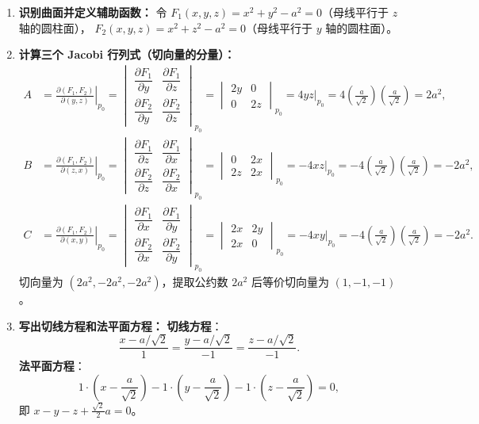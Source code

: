 \documentclass[lang=cn,11pt]{elegantbook}
\begin{document}
\begin{solution}
\begin{enumerate}
  \item \textbf{识别曲面并定义辅助函数：}
  令 $F_1(x,y,z)=x^2+y^2-a^2=0$（母线平行于 $z$ 轴的圆柱面），
  $F_2(x,y,z)=x^2+z^2-a^2=0$（母线平行于 $y$ 轴的圆柱面）。

  \item \textbf{计算三个 Jacobi 行列式（切向量的分量）：}
  \begin{align*}
  A &= \left.\frac{\partial(F_1,F_2)}{\partial(y,z)}\right|_{p_0}
   = \begin{vmatrix}
      \dfrac{\partial F_1}{\partial y}&\dfrac{\partial F_1}{\partial z}\\[8pt]
      \dfrac{\partial F_2}{\partial y}&\dfrac{\partial F_2}{\partial z}
    \end{vmatrix}_{p_0}
   = \begin{vmatrix} 2y & 0 \\ 0 & 2z \end{vmatrix}_{p_0}
   = 4yz\Big|_{p_0} = 4\left(\frac{a}{\sqrt{2}}\right)\left(\frac{a}{\sqrt{2}}\right) = 2a^2,\\[10pt]
  B &= \left.\frac{\partial(F_1,F_2)}{\partial(z,x)}\right|_{p_0}
   = \begin{vmatrix}
      \dfrac{\partial F_1}{\partial z}&\dfrac{\partial F_1}{\partial x}\\[8pt]
      \dfrac{\partial F_2}{\partial z}&\dfrac{\partial F_2}{\partial x}
    \end{vmatrix}_{p_0}
   = \begin{vmatrix} 0 & 2x \\ 2z & 2x \end{vmatrix}_{p_0}
   = -4xz\Big|_{p_0} = -4\left(\frac{a}{\sqrt{2}}\right)\left(\frac{a}{\sqrt{2}}\right) = -2a^2,\\[10pt]
  C &= \left.\frac{\partial(F_1,F_2)}{\partial(x,y)}\right|_{p_0}
   = \begin{vmatrix}
      \dfrac{\partial F_1}{\partial x}&\dfrac{\partial F_1}{\partial y}\\[8pt]
      \dfrac{\partial F_2}{\partial x}&\dfrac{\partial F_2}{\partial y}
    \end{vmatrix}_{p_0}
   = \begin{vmatrix} 2x & 2y \\ 2x & 0 \end{vmatrix}_{p_0}
   = -4xy\Big|_{p_0} = -4\left(\frac{a}{\sqrt{2}}\right)\left(\frac{a}{\sqrt{2}}\right) = -2a^2.
  \end{align*}
  切向量为 $(2a^2, -2a^2, -2a^2)$，提取公约数 $2a^2$ 后等价切向量为 $(1, -1, -1)$。

  \item \textbf{写出切线方程和法平面方程：}
  \textbf{切线方程}：
  \[
  \boxed{\frac{x-a/\sqrt2}{1} =\frac{y-a/\sqrt2}{-1} =\frac{z-a/\sqrt2}{-1}}.
  \]
  \textbf{法平面方程}：
  \[
  1\cdot\left(x-\frac{a}{\sqrt2}\right) - 1\cdot\left(y-\frac{a}{\sqrt2}\right) - 1\cdot\left(z-\frac{a}{\sqrt2}\right)=0,
  \]
  即 $\boxed{x-y-z+\frac{\sqrt2}{2}a=0}$。
\end{enumerate}
\end{solution}
\end{document}
